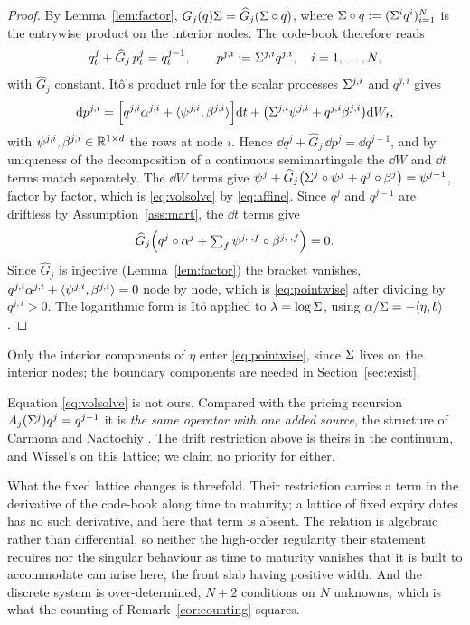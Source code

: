 \begin{proof}
By Lemma~\ref{lem:factor}, $G_j(q)\Sigma=\widehat G_j(\Sigma\circ q)$, where
$\Sigma\circ q:=(\Sigma^iq^i)_{i=1}^{N}$ is the entrywise product on the interior nodes. The
code-book therefore reads
\[
  q^j_t+\widehat G_j\,p^j_t=q^{j-1}_t,\qquad p^{j,i}:=\Sigma^{j,i}q^{j,i},\quad i=1,\dots,N,
\]
with $\widehat G_j$ constant. It\^o's product rule for the scalar processes $\Sigma^{j,i}$ and
$q^{j,i}$ gives
\begin{equation}\label{eq:dp}
  \mathrm d p^{j,i}
  =\Bigl[q^{j,i}\alpha^{j,i}+\langle \psi^{j,i},\beta^{j,i}\rangle\Bigr]\mathrm d t
  +\bigl(\Sigma^{j,i}\psi^{j,i}+q^{j,i}\beta^{j,i}\bigr)\mathrm d W_t ,
\end{equation}
with $\psi^{j,i},\beta^{j,i}\in\mathbb R^{1\times d}$ the rows at node $i$. Hence
$\dd q^j+\widehat G_j\,\dd p^j=\dd q^{j-1}$, and by uniqueness of the decomposition of a
continuous semimartingale the $\dd W$ and $\dd t$ terms match separately. The $\dd W$
terms give $\psi^j+\widehat G_j\bigl(\Sigma^j\circ\psi^j+q^j\circ\beta^j\bigr)=\psi^{j-1}$,
factor by factor, which is \eqref{eq:volsolve} by \eqref{eq:affine}. Since $q^j$ and
$q^{j-1}$ are driftless by Assumption~\ref{ass:mart}, the $\dd t$ terms give
\[
  \widehat G_j\Bigl(q^j\circ\alpha^j+\textstyle\sum_f\psi^{j,\cdot,f}\circ\beta^{j,\cdot,f}\Bigr)=0 .
\]
Since $\widehat G_j$ is injective (Lemma~\ref{lem:factor}) the bracket vanishes,
$q^{j,i}\alpha^{j,i}+\langle \psi^{j,i},\beta^{j,i}\rangle=0$ node by node, which is
\eqref{eq:pointwise} after dividing by $q^{j,i}>0$. The logarithmic form is It\^o
applied to $\lambda=\log\Sigma$, using $\alpha/\Sigma=-\langle \eta,b\rangle$.
\end{proof}

Only the interior components of $\eta$ enter \eqref{eq:pointwise}, since $\Sigma$ lives
on the interior nodes; the boundary components are needed in Section~\ref{sec:exist}.

Equation \eqref{eq:volsolve} is not ours. Compared with the pricing recursion
$A_j(\Sigma^j)q^j=q^{j-1}$ it is \emph{the same operator with one added source},
the structure of Carmona and Nadtochiy \cite{CarmonaNadtochiy2008}. The drift
restriction above is theirs in the continuum, and Wissel's \cite{Wissel2007} on
this lattice; we claim no priority for either.

What the fixed lattice changes is threefold. Their restriction carries a term in
the derivative of the code-book along time to maturity; a lattice of fixed expiry
dates has no such derivative, and here that term is absent. The relation is algebraic rather than
differential, so neither the high-order regularity their statement requires nor
the singular behaviour as time to maturity vanishes that it is built to
accommodate can arise here, the front slab having positive width. And the
discrete system is over-determined, $N+2$ conditions on $N$ unknowns, which is
what the counting of Remark~\ref{cor:counting} squares.

